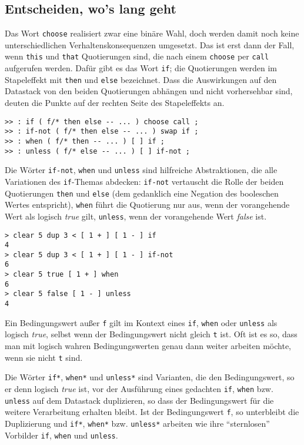 \subsection{Entscheiden, wo's lang geht}

Das Wort \verb|choose| realisiert zwar eine binäre Wahl, doch werden damit noch keine unterschiedlichen Verhaltenskonsequenzen umgesetzt. Das ist erst dann der Fall, wenn \verb|this| und \verb|that| Quotierungen sind, die nach einem \verb|choose| per \verb|call| aufgerufen werden. Dafür gibt es das Wort \verb|if|; die Quotierungen werden im Stapeleffekt mit \verb|then| und \verb|else| bezeichnet. Dass die Auswirkungen auf den Datastack von den beiden Quotierungen abhängen und nicht vorhersehbar sind, deuten die Punkte auf der rechten Seite des Stapeleffekts an.

\begin{verbatim}
>> : if ( f/* then else -- ... ) choose call ;
>> : if-not ( f/* then else -- ... ) swap if ;
>> : when ( f/* then -- ... ) [ ] if ;
>> : unless ( f/* else -- ... ) [ ] if-not ;
\end{verbatim}

Die Wörter \verb|if-not|, \verb|when| und \verb|unless| sind hilfreiche Abstraktionen, die alle Variationen des \verb|if|-Themas abdecken: \verb|if-not| vertauscht die Rolle der beiden Quotierungen \verb|then| und \verb|else| (dem gedanklich eine Negation des booleschen Wertes entspricht), \verb|when| führt die Quotierung nur aus, wenn der vorangehende Wert als logisch \emph{true} gilt, \verb|unless|, wenn der vorangehende Wert \emph{false} ist.

\begin{verbatim}
> clear 5 dup 3 < [ 1 + ] [ 1 - ] if
4
> clear 5 dup 3 < [ 1 + ] [ 1 - ] if-not
6
> clear 5 true [ 1 + ] when
6
> clear 5 false [ 1 - ] unless
4
\end{verbatim}

Ein Bedingungswert außer \verb|f| gilt im Kontext eines \verb|if|, \verb|when| oder \verb|unless| als logisch \emph{true}, selbst wenn der Bedingungswert nicht gleich \verb|t| ist. Oft ist es so, dass man mit logisch wahren Bedingungswerten genau dann weiter arbeiten möchte, wenn sie nicht \verb|t| sind.

Die Wörter \verb|if*|, \verb|when*| und \verb|unless*| sind Varianten, die den Bedingungswert, so er denn logisch \emph{true} ist, vor der Ausführung eines gedachten \verb|if|, \verb|when| bzw. \verb|unless| auf dem Datastack duplizieren, so dass der Bedingungswert für die weitere Verarbeitung erhalten bleibt. Ist der Bedingungswert \verb|f|, so unterbleibt die Duplizierung und \verb|if*|, \verb|when*| bzw. \verb|unless*| arbeiten wie ihre "`sternlosen"' Vorbilder \verb|if|, \verb|when| und \verb|unless|.

